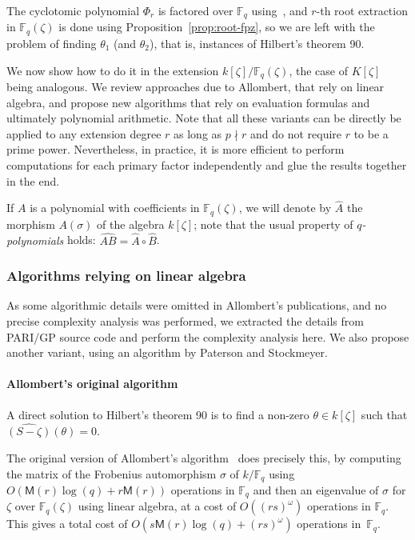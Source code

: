 \documentclass[12pt]{article}
\theoremstyle{plain}
\theoremstyle{definition}
\def\F{\ensuremath{\mathbb{F}}}
\def\MM{\ensuremath{\mathsf{M}}}
\newcounter{algorithm}
\begin{document}

The cyclotomic polynomial $\Phi_r$ is factored over $\F_q$
using~\cite[Theorem~9]{shoup94}, and $r$-th root extraction in
$\F_q(\zeta)$ is done using Proposition~\ref{prop:root-fpz}, so we are
left with the problem of finding $\theta_1$ (and $\theta_2$), that is,
instances of Hilbert's theorem 90.  

We now show how to do it in the extension $k[\zeta]/\F_q(\zeta)$, the
case of $K[\zeta]$ being analogous. We review approaches due to
Allombert, that rely on linear algebra, and propose new algorithms
that rely on evaluation formulas and ultimately polynomial
arithmetic. Note that all these variants can be directly be applied to
any extension degree $r$ as long as $p \nmid r$ and do not require $r$
to be a prime power.  Nevertheless, in practice, it is more efficient
to perform computations for each primary factor independently and glue
the results together in the end.

If $A$ is a polynomial with coefficients in $\F_q(\zeta)$, we will
denote by $\hat{A}$ the morphism $A(\sigma)$ of the algebra
$k[\zeta]$; note that the usual property of \emph{$q$-polynomials}
holds: $\widehat{AB} = \hat{A}\circ\hat{B}$.

\subsubsection{Algorithms relying on linear algebra}

As some algorithmic details were omitted in Allombert's publications,
and no precise complexity analysis was performed, we extracted the
details from PARI/GP source code and perform the complexity analysis
here.  We also propose another variant, using an algorithm by Paterson
and Stockmeyer.

\paragraph{Allombert's original algorithm}
A direct solution to Hilbert's theorem 90 is to find a non-zero
$\theta\in k[\zeta]$ such that $\widehat{(S-\zeta)}(\theta)=0$.

The original version of Allombert's algorithm~\cite{Allombert02} does
precisely this, by computing the matrix of the Frobenius automorphism
$\sigma$ of $k/\F_q$ using $O(\MM(r) \log(q) + r \MM(r))$ operations
in $\F_q$ and then an eigenvalue of $\sigma$ for $\zeta$ over
$\F_q(\zeta)$ using linear algebra, at a cost of $O((rs)^\omega)$
operations in $\F_q$. This gives a total cost of $O(s \MM(r) \log(q) +
(rs)^{\omega})$ operations in~$\F_q$.
\end{document}
